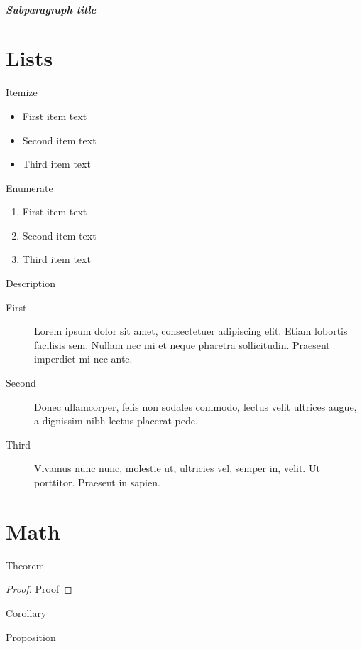 \documentclass[italian,english]{uniud}
\begin{document}
\blindtext

\subparagraph{Subparagraph title}

\blindtext

\section{Lists}


Itemize
\begin{itemize}
\item First item text
\item Second item text
\item Third item text
\end{itemize}
Enumerate
\begin{enumerate}
\item First item text
\item Second item text
\item Third item text
\end{enumerate}
Description
\begin{description}
\item[First] 
	Lorem ipsum dolor sit amet, consectetuer adipiscing elit. Etiam lobortis facilisis sem. Nullam nec mi et neque pharetra sollicitudin. Praesent imperdiet mi nec ante.
\item[Second] 
	 Donec ullamcorper, felis non sodales commodo, lectus velit ultrices augue, a dignissim nibh lectus placerat pede.
\item[Third] 
	Vivamus nunc nunc, molestie ut, ultricies vel, semper in, velit. Ut porttitor. Praesent in sapien.
\end{description}


\section{Math}

\begin{theorem}
	\label{thm:first}
	Theorem
\end{theorem}

\begin{proof}
	Proof
\end{proof}

\begin{corollary}
	\label{cor:first}
	Corollary
\end{corollary}

\begin{proposition}
	\label{prop:first}
	Proposition
\end{proposition}
\end{document}

